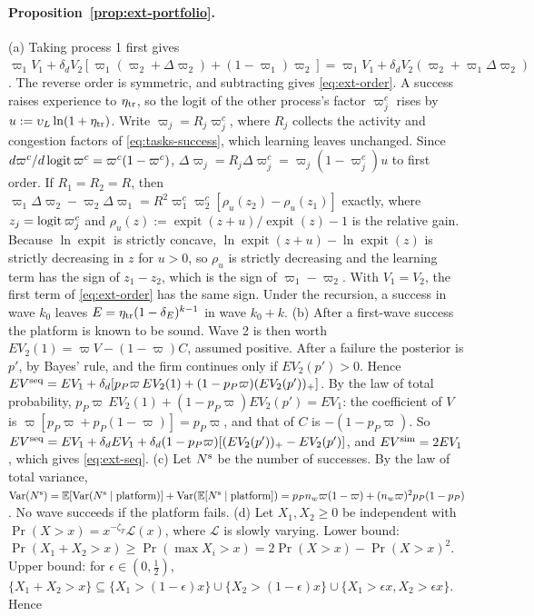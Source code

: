\paragraph{Proposition~\ref{prop:ext-portfolio}.} (a) Taking process 1 first gives $\varpi_1V_1+\delta_dV_2[\varpi_1(\varpi_2+\Delta\varpi_2)+(1-\varpi_1)\varpi_2]=\varpi_1V_1+\delta_dV_2(\varpi_2+\varpi_1\Delta\varpi_2)$. The reverse order is symmetric, and subtracting gives \eqref{eq:ext-order}. A success raises experience to $\eta_{\rm tr}$, so the logit of the other process's factor $\varpi^c_j$ rises by $u:=\upsilon_L\ln(1+\eta_{\rm tr})$. Write $\varpi_j=R_j\varpi^c_j$, where $R_j$ collects the activity and congestion factors of \eqref{eq:tasks-success}, which learning leaves unchanged. Since $d\varpi^c/d\,{\rm logit}\,\varpi^c=\varpi^c(1-\varpi^c)$, $\Delta\varpi_j=R_j\Delta\varpi^c_j=\varpi_j(1-\varpi^c_j)u$ to first order. If $R_1=R_2=R$, then $\varpi_1\Delta\varpi_2-\varpi_2\Delta\varpi_1=R^2\varpi^c_1\varpi^c_2[\rho_u(z_2)-\rho_u(z_1)]$ exactly, where $z_j={\rm logit}\,\varpi^c_j$ and $\rho_u(z):=\operatorname{expit}(z+u)/\operatorname{expit}(z)-1$ is the relative gain. Because $\ln\operatorname{expit}$ is strictly concave, $\ln\operatorname{expit}(z+u)-\ln\operatorname{expit}(z)$ is strictly decreasing in $z$ for $u>0$, so $\rho_u$ is strictly decreasing and the learning term has the sign of $z_1-z_2$, which is the sign of $\varpi_1-\varpi_2$. With $V_1=V_2$, the first term of \eqref{eq:ext-order} has the same sign. Under the recursion, a success in wave $k_0$ leaves $E=\eta_{\rm tr}(1-\delta_E)^{k-1}$ in wave $k_0+k$.
(b) After a first-wave success the platform is known to be sound. Wave 2 is then worth $EV_2(1)=\varpi V-(1-\varpi)C$, assumed positive. After a failure the posterior is $p'$, by Bayes' rule, and the firm continues only if $EV_2(p')>0$. Hence $EV^{\rm seq}=EV_1+\delta_d[p_P\varpi\,EV_2(1)+(1-p_P\varpi)(EV_2(p'))_+]$. By the law of total probability, $p_P\varpi\,EV_2(1)+(1-p_P\varpi)EV_2(p')=EV_1$: the coefficient of $V$ is $\varpi[p_P\varpi+p_P(1-\varpi)]=p_P\varpi$, and that of $C$ is $-(1-p_P\varpi)$. So $EV^{\rm seq}=EV_1+\delta_dEV_1+\delta_d(1-p_P\varpi)[(EV_2(p'))_+-EV_2(p')]$, and $EV^{\rm sim}=2EV_1$, which gives \eqref{eq:ext-seq}.
(c) Let $N^{\rm s}$ be the number of successes. By the law of total variance, $\mathrm{Var}(N^{\rm s})=\mathbb E[\mathrm{Var}(N^{\rm s}\mid\text{platform})]+\mathrm{Var}(\mathbb E[N^{\rm s}\mid\text{platform}])=p_Pn_w\varpi(1-\varpi)+(n_w\varpi)^2p_P(1-p_P)$. No wave succeeds if the platform fails.
(d) Let $X_1,X_2\ge0$ be independent with $\Pr(X>x)=x^{-\zeta_T}\mathcal L(x)$, where $\mathcal L$ is slowly varying. Lower bound: $\Pr(X_1+X_2>x)\ge\Pr(\max X_i>x)=2\Pr(X>x)-\Pr(X>x)^2$. Upper bound: for $\epsilon\in(0,\tfrac12)$, $\{X_1+X_2>x\}\subseteq\{X_1>(1-\epsilon)x\}\cup\{X_2>(1-\epsilon)x\}\cup\{X_1>\epsilon x,X_2>\epsilon x\}$. Hence
